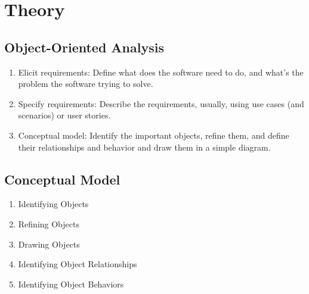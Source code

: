 \documentclass[12pt,a4paper,titlepage]{article}
\begin{document}
\section{Theory}

\subsection{Object-Oriented Analysis}
\begin{enumerate}  
	\item Elicit requirements: Define what does the software need to do, and what’s the problem the software trying to solve.
	\item Specify requirements: Describe the requirements, usually, using use cases (and scenarios) or user stories.
	\item Conceptual model: Identify the important objects, refine them, and define their relationships and behavior and draw them in a simple diagram.
\end{enumerate}


\subsection{Conceptual Model}
\begin{enumerate}  
	\item Identifying Objects
	\item Refining Objects
	\item Drawing Objects
	\item Identifying Object Relationships
	\item Identifying Object Behaviors
\end{enumerate}
\clearpage
\end{document}
